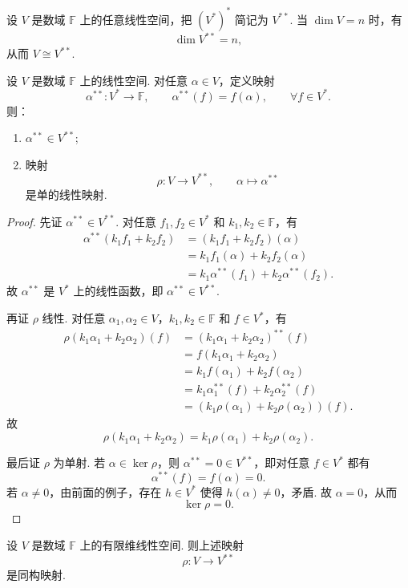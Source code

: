设 $V$ 是数域 $\mathbb{F}$ 上的任意线性空间，把 $(V^*)^*$ 简记为 $V^{**}$.
当 $\dim V=n$ 时，有
\[
\dim V^{**}=n,
\]
从而 $V\cong V^{**}$.

\begin{lemma}
	设 $V$ 是数域 $\mathbb{F}$ 上的线性空间. 对任意 $\alpha\in V$，定义映射
	\[
	\alpha^{**}:V^*\longrightarrow \mathbb{F},\qquad \alpha^{**}(f)=f(\alpha),\qquad \forall f\in V^*.
	\]
	则：
	\begin{enumerate}
		\item $\alpha^{**}\in V^{**}$;
		\item 映射
		\[
		\rho:V\longrightarrow V^{**},\qquad \alpha\longmapsto \alpha^{**}
		\]
		是单的线性映射.
	\end{enumerate}
\end{lemma}

\begin{proof}
	先证 $\alpha^{**}\in V^{**}$. 对任意 $f_1,f_2\in V^*$ 和 $k_1,k_2\in\mathbb{F}$，有
	\[
	\begin{aligned}
		\alpha^{**}(k_1f_1+k_2f_2)
		&=(k_1f_1+k_2f_2)(\alpha)\\
		&=k_1f_1(\alpha)+k_2f_2(\alpha)\\
		&=k_1\alpha^{**}(f_1)+k_2\alpha^{**}(f_2).
	\end{aligned}
	\]
	故 $\alpha^{**}$ 是 $V^*$ 上的线性函数，即 $\alpha^{**}\in V^{**}$.
	
	再证 $\rho$ 线性. 对任意 $\alpha_1,\alpha_2\in V$，$k_1,k_2\in\mathbb{F}$ 和 $f\in V^*$，有
	\[
	\begin{aligned}
		\rho(k_1\alpha_1+k_2\alpha_2)(f)
		&=(k_1\alpha_1+k_2\alpha_2)^{**}(f)\\
		&=f(k_1\alpha_1+k_2\alpha_2)\\
		&=k_1f(\alpha_1)+k_2f(\alpha_2)\\
		&=k_1\alpha_1^{**}(f)+k_2\alpha_2^{**}(f)\\
		&=(k_1\rho(\alpha_1)+k_2\rho(\alpha_2))(f).
	\end{aligned}
	\]
	故
	\[
	\rho(k_1\alpha_1+k_2\alpha_2)=k_1\rho(\alpha_1)+k_2\rho(\alpha_2).
	\]
	
	最后证 $\rho$ 为单射. 若 $\alpha\in\ker\rho$，则 $\alpha^{**}=0\in V^{**}$，即对任意
	$f\in V^*$ 都有
	\[
	\alpha^{**}(f)=f(\alpha)=0.
	\]
	若 $\alpha\ne0$，由前面的例子，存在 $h\in V^*$ 使得 $h(\alpha)\ne0$，矛盾. 故 $\alpha=0$，从而
	\[
	\ker\rho=0.
	\]
\end{proof}

\begin{theorem}[对偶定理]
	设 $V$ 是数域 $\mathbb{F}$ 上的有限维线性空间. 则上述映射
	\[
	\rho:V\longrightarrow V^{**}
	\]
	是同构映射.
\end{theorem}

